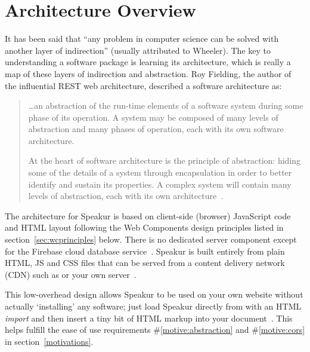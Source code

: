 \section{Architecture Overview}
It has been said that ``any problem in computer science can be solved with another layer of indirection'' (usually attributed to Wheeler).
The key to understanding a software package is learning its architecture,
which is really a map of these layers of indirection and abstraction.
Roy Fielding, the author of the influential REST web architecture, described a software architecture as:

\begin{quote}
\dots an abstraction of the run-time elements of a software system during some phase of its operation. A system may be composed of many levels of abstraction and many phases of operation, each with its own software architecture.

At the heart of software architecture is the principle of abstraction: hiding some of the details of a system through encapsulation in order to better identify and sustain its properties. A complex system will contain many levels of abstraction, each with its own architecture~\cite{fielding2000}.
\end{quote}

The architecture for Speakur is based on client-side (browser) JavaScript code and HTML layout following the Web Components design principles listed in section~\ref{sec:wcprinciples} below. 
There is no dedicated server component except for the Firebase cloud database service~\cite{firebasecontributors2015}.
Speakur is built entirely from plain HTML, JS and CSS files that can be served from a content delivery network (CDN) 
such as  or your own server~\cite{landers2015-d}.

This low-overhead design allows Speakur to be used on your own website without actually `installing' any software;
just load Speakur directly from  with an HTML \textit{import}
and then insert a tiny bit of HTML markup into your document~\cite{landers2015-d}.
This helps fulfill the ease of use requirements 
\#\ref{motive:abstraction} and \#\ref{motive:cors}
in section~\ref{motivations}.

